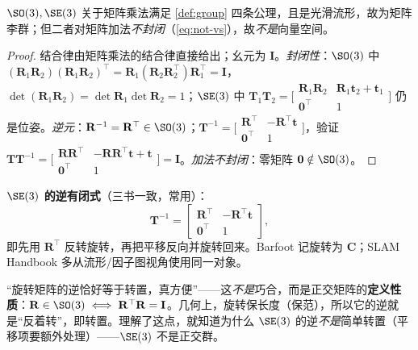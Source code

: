 \begin{proposition}[$\SO(3),\SE(3)$ 是矩阵李群]\label{prop:matrix-lie}
$\SO(3),\SE(3)$ 关于矩阵乘法满足 \cref{def:group} 四条公理，且是光滑流形，故为矩阵李群；但二者对矩阵加法\emph{不封闭}（\cref{eq:not-vs}），故\emph{不是}向量空间。
\end{proposition}
\begin{proof}
结合律由矩阵乘法的结合律直接给出；幺元为 $\mathbf{I}$。\emph{封闭性}：$\SO(3)$ 中 $(\mathbf{R}_1\mathbf{R}_2)(\mathbf{R}_1\mathbf{R}_2)^\top=\mathbf{R}_1(\mathbf{R}_2\mathbf{R}_2^\top)\mathbf{R}_1^\top=\mathbf{I}$，$\det(\mathbf{R}_1\mathbf{R}_2)=\det\mathbf{R}_1\det\mathbf{R}_2=1$；$\SE(3)$ 中 $\mathbf{T}_1\mathbf{T}_2=\big[\begin{smallmatrix}\mathbf{R}_1\mathbf{R}_2&\mathbf{R}_1\mathbf{t}_2+\mathbf{t}_1\\\mathbf{0}^\top&1\end{smallmatrix}\big]$ 仍是位姿。\emph{逆元}：$\mathbf{R}^{-1}=\mathbf{R}^\top\in\SO(3)$；$\mathbf{T}^{-1}=\big[\begin{smallmatrix}\mathbf{R}^\top&-\mathbf{R}^\top\mathbf{t}\\\mathbf{0}^\top&1\end{smallmatrix}\big]$，验证 $\mathbf{T}\mathbf{T}^{-1}=\big[\begin{smallmatrix}\mathbf{R}\mathbf{R}^\top&-\mathbf{R}\mathbf{R}^\top\mathbf{t}+\mathbf{t}\\\mathbf{0}^\top&1\end{smallmatrix}\big]=\mathbf{I}$。\emph{加法不封闭}：零矩阵 $\mathbf{0}\notin\SO(3)$。
\end{proof}

\begin{note}
\textbf{$\SE(3)$ 的逆有闭式}（三书一致，常用）：
\[
  \mathbf{T}^{-1}=\begin{bmatrix}\mathbf{R}^\top&-\mathbf{R}^\top\mathbf{t}\\\mathbf{0}^\top&1\end{bmatrix},
\]
即先用 $\mathbf{R}^\top$ 反转旋转，再把平移反向并旋转回来。Barfoot 记旋转为 $\mathbf{C}$；SLAM Handbook 多从流形/因子图视角使用同一对象。
\end{note}

\begin{pitfall}[概念误区：把 $\mathbf{R}^{-1}=\mathbf{R}^\top$ 当成巧合]
“旋转矩阵的逆恰好等于转置，真方便”——这\emph{不是}巧合，而是正交矩阵的\textbf{定义性质}：$\mathbf{R}\in\SO(3)\iff\mathbf{R}^\top\mathbf{R}=\mathbf{I}$。几何上，旋转保长度（保范），所以它的逆就是“反着转”，即转置。理解了这点，就知道为什么 $\SE(3)$ 的逆\emph{不是}简单转置（平移项要额外处理）——$\SE(3)$ 不是正交群。
\end{pitfall}

